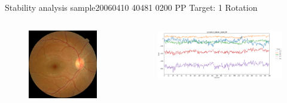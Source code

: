 \documentclass{beamer}
\begin{document}
\begin{frame}{Stability analysis sample}{20060410 40481 0200 PP Target: 1 Rotation}
\begin{columns}
	\begin{column}{0.3\textwidth}
		\begin{figure}[p]
			\centering
			\includegraphics[width=\textwidth]{chapter_stability/20060410_40481_0200_PP/20060410_40481_0200_PP.jpeg}
		\end{figure}	
	\end{column}
	\begin{column}{0.45\textwidth}  %
		\begin{figure}[p]
			\centering
			\includegraphics[width=\textwidth]{chapter_stability/20060410_40481_0200_PP/r/scores.png}
		\end{figure}
		\centering
		\href{run:videos_stability/Messidor_20060410_40481_0200_PP_Target_1_Checking_Rotation_Sensitivity.mp4}{\color{blue}{Rotation Visualization}} 
	\end{column}
\end{columns}
\end{frame}
\end{document}
